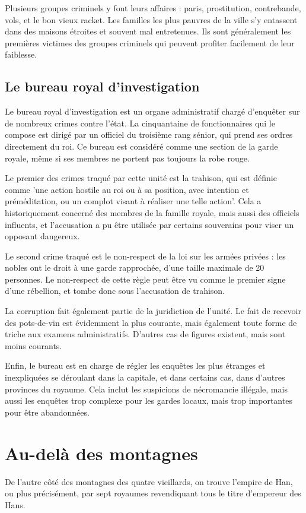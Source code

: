 \documentclass[10pt,a4paper]{book}
\begin{document}
Plusieurs groupes criminels y font leurs affaires : paris, prostitution, contrebande, vols, et le bon vieux racket. Les familles les plus pauvres de la ville s'y entassent dans des maisons étroites et souvent mal entretenues. Ils sont généralement les premières victimes des groupes criminels qui peuvent profiter facilement de leur faiblesse.
\subsection{Le bureau royal d'investigation}
Le bureau royal d'investigation est un organe administratif chargé d'enquêter sur de nombreux crimes contre l'état. La cinquantaine de fonctionnaires qui le compose est dirigé par un officiel du troisième rang sénior, qui prend ses ordres directement du roi. Ce bureau est considéré comme une section de la garde royale, même si ses membres ne portent pas toujours la robe rouge.

Le premier des crimes traqué par cette unité est la trahison, qui est définie comme 'une action hostile au roi ou à sa position, avec intention et préméditation, ou un complot visant à réaliser une telle action'. Cela a historiquement concerné des membres de la famille royale, mais aussi des officiels influents, et l'accusation a pu être utilisée par certains souverains pour viser un opposant dangereux.

Le second crime traqué est le non-respect de la loi sur les armées privées : les nobles ont le droit à une garde rapprochée, d'une taille maximale de 20 personnes. Le non-respect de cette règle peut être vu comme le premier signe d'une rébellion, et tombe donc sous l'accusation de trahison.

La corruption fait également partie de la juridiction de l'unité. Le fait de recevoir des pots-de-vin est évidemment la plus courante, mais également toute forme de triche aux examens administratifs. D'autres cas de figures existent, mais sont moins courants.

Enfin, le bureau est en charge de régler les enquêtes les plus étranges et inexpliquées se déroulant dans la capitale, et dans certains cas, dans d'autres provinces du royaume. Cela inclut les suspicions de nécromancie illégale, mais aussi les enquêtes trop complexe pour les gardes locaux, mais trop importantes pour être abandonnées.
\section{Au-delà des montagnes}
De l'autre côté des montagnes des quatre vieillards, on trouve l'empire de Han, ou plus précisément, par sept royaumes revendiquant tous le titre d'empereur des Hans.
\end{document}
